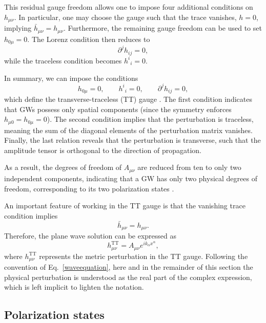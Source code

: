 This residual gauge freedom allows one to impose four additional conditions on
$h_{\mu\nu}$. In particular, one may choose the gauge such that the trace
vanishes, $h = 0$, implying $\bar{h}_{\mu\nu} = h_{\mu\nu}$. Furthermore, the
remaining gauge freedom can be used to set $h_{0\mu} = 0$. The Lorenz condition
then reduces to
\begin{equation}
\partial^j h_{ij} = 0,
\end{equation}
while the traceless condition becomes $h^i{}_i = 0$.

In summary, we can impose the conditions
\begin{equation}
h_{0\mu} = 0, \qquad h^i{}_i = 0, \qquad \partial^j h_{ij} = 0,
\end{equation}
which define the transverse-traceless (TT) gauge \cite{maggiore2007gravitational}. The first condition indicates that GWs possess only spatial components (since the symmetry enforces $h_{\mu 0} = h_{0 \mu} = 0$). The second condition implies that the perturbation is traceless, meaning the sum of the diagonal elements of the perturbation matrix vanishes. Finally, the last relation reveals that the perturbation is transverse, such that the amplitude tensor is orthogonal to the direction of propagation.

As a result, the degrees of freedom of $A_{\mu\nu}$ are reduced from ten to only two independent components, indicating that a GW has only two physical degrees of freedom, corresponding to its two polarization states \cite{llibreFerrariValeriaGR}.  

An important feature of working in the TT gauge is that the vanishing trace condition implies
\begin{equation}
    \bar{h}_{\mu\nu} = h_{\mu\nu}.
\end{equation}
Therefore, the plane wave solution can be expressed as
\begin{equation}
    h_{\mu\nu}^{\text{TT}} = A_{\mu\nu} e^{i k_\alpha x^\alpha},
\end{equation}
where $h_{\mu\nu}^{\text{TT}}$ represents the metric perturbation in the TT gauge. Following the convention of Eq.~\eqref{waveequation}, here and in the remainder of this section the physical perturbation is understood as the real part of the complex expression, which is left implicit to lighten the notation.


\subsection{Polarization states}

